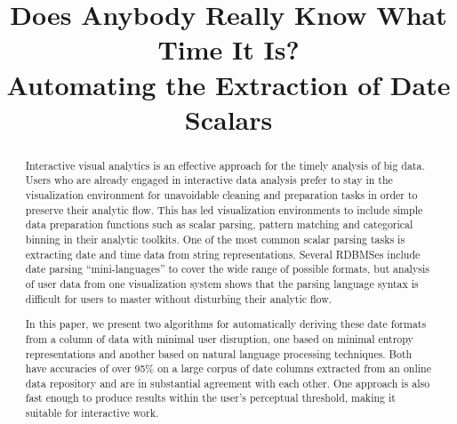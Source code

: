 \documentclass[conference]{IEEEtran}
\begin{document}
\title{Does Anybody Really Know What Time It Is?\\
Automating the Extraction of Date Scalars}


\maketitle
\begin{abstract}
Interactive visual analytics is an effective approach for the timely analysis of big data. Users who are already engaged in interactive data analysis prefer to stay in the visualization environment for unavoidable cleaning and preparation tasks in order to preserve their analytic flow. This has led visualization environments to include simple data preparation functions such as scalar parsing, pattern matching and categorical binning in their analytic toolkits. One of the most common scalar parsing tasks is extracting date and time data from string representations. Several RDBMSes include date parsing ``mini-languages'' to cover the wide range of possible formats, but analysis of user data from one visualization system shows that the parsing language syntax is difficult for users to master without disturbing their analytic flow.

In this paper, we present two algorithms for automatically deriving these date formats from a column of data with minimal user disruption, one based on minimal entropy representations and another based on natural language processing techniques. Both have accuracies of over 95\% on a large corpus of date columns extracted from an online data repository and are in substantial agreement with each other. One approach is also fast enough to produce results within the user's perceptual threshold, making it suitable for interactive work.
\end{abstract}
\end{document}
